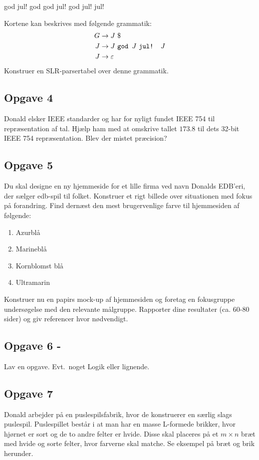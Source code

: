 \begin{center}
    god jul! god god jul! god jul! jul!
\end{center}

Kortene kan beskrives med følgende grammatik:
\begin{align*}
    G&\to J\ \$ \\
    J&\to J \text{ \ttfamily god } J \text{ \ttfamily jul! } J \\
    J&\to \varepsilon
\end{align*}
Konstruer en SLR-parsertabel over denne grammatik.


\subsection{Opgave 4}
Donald elsker IEEE standarder og har for nyligt fundet IEEE 754 til
repræsentation af tal. Hjælp ham med at omskrive tallet $173.8$ til dets
32-bit IEEE 754 repræsentation. Blev der mistet præcision?


\subsection{Opgave 5}
Du skal designe en ny hjemmeside for et lille firma ved navn Donalds EDB'eri,
der sælger edb-spil til folket. Konstruer et rigt billede over situationen med
fokus på forandring. Find dernæst den mest brugervenlige farve til hjemmesiden
af følgende:
\begin{enumerate}
    \item Azurblå
    \item Marineblå
    \item Kornblomst blå
    \item Ultramarin
\end{enumerate}
Konstruer nu en papirs mock-up af hjemmesiden og foretag en fokusgruppe
undersøgelse med den relevante målgruppe. Rapporter dine resultater (ca.
60-80 sider) og giv referencer hvor nødvendigt.


\subsection{Opgave 6 - \color{red}{TODO!}}

Lav en opgave. Evt.~noget Logik eller lignende.

\subsection{Opgave 7}
Donald arbejder på en puslespilsfabrik, hvor de konstruerer en særlig slags
puslespil. Puslespillet består i at man har en masse L-formede brikker, hvor
hjørnet er sort og de to andre felter er hvide. Disse skal placeres på et
$m\times n$ bræt med hvide og sorte felter, hvor farverne skal matche. Se
eksempel på bræt og brik herunder.

